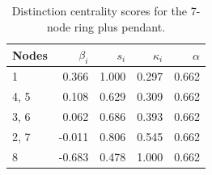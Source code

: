 \begin{table}
\centering
\caption{\label{tab:ring7pendant}Distinction centrality scores for the 7-node ring plus pendant.}
\centering
\begin{tabular}[t]{lrrrr}
\toprule
Nodes & $\beta_i$ & $s_i$ & $\kappa_i$ & $\alpha$\\
\midrule
1 & 0.366 & 1.000 & 0.297 & 0.662\\
4, 5 & 0.108 & 0.629 & 0.309 & 0.662\\
3, 6 & 0.062 & 0.686 & 0.393 & 0.662\\
2, 7 & -0.011 & 0.806 & 0.545 & 0.662\\
8 & -0.683 & 0.478 & 1.000 & 0.662\\
\bottomrule
\end{tabular}
\end{table}
